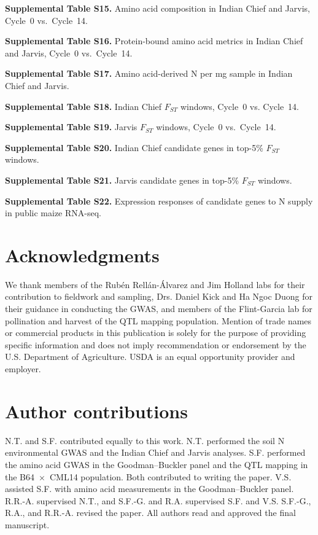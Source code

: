 \documentclass[namedate,unnumsec,webpdf,contemporary,large]{oup-authoring-template}
\begin{document}
\textbf{Supplemental Table S15.} Amino acid composition in Indian Chief and Jarvis, Cycle~0 vs.\ Cycle~14.

\textbf{Supplemental Table S16.} Protein-bound amino acid metrics in Indian Chief and Jarvis, Cycle~0 vs.\ Cycle~14.

\textbf{Supplemental Table S17.} Amino acid-derived N per mg sample in Indian Chief and Jarvis.

\textbf{Supplemental Table S18.} Indian Chief $F_{ST}$ windows, Cycle~0 vs. Cycle~14.

\textbf{Supplemental Table S19.} Jarvis $F_{ST}$ windows, Cycle~0 vs.\ Cycle~14.

\textbf{Supplemental Table S20.} Indian Chief candidate genes in top-5\% $F_{ST}$ windows.

\textbf{Supplemental Table S21.} Jarvis candidate genes in top-5\% $F_{ST}$ windows.

\textbf{Supplemental Table S22.} Expression responses of candidate genes to N supply in public maize RNA-seq.

\section{Acknowledgments}
We thank members of the Rub\'en Rell\'an-\'Alvarez and Jim Holland labs for their contribution to fieldwork and sampling, Drs. Daniel Kick and Ha Ngoc Duong for their guidance in conducting the GWAS, and members of the Flint-Garcia lab for pollination and harvest of the QTL mapping population. Mention of trade names or commercial products in this publication is solely for the purpose of providing specific information and does not imply recommendation or endorsement by the U.S. Department of Agriculture. USDA is an equal opportunity provider and employer.

\section{Author contributions}
N.T. and S.F. contributed equally to this work. N.T. performed the soil N environmental GWAS and the Indian Chief and Jarvis analyses. S.F. performed the amino acid GWAS in the Goodman--Buckler panel and the QTL mapping in the B64~$\times$~CML14 population. Both contributed to writing the paper. V.S. assisted S.F. with amino acid measurements in the Goodman--Buckler panel. R.R.-A. supervised N.T., and S.F.-G. and R.A. supervised S.F. and V.S. S.F.-G., R.A., and R.R.-A. revised the paper. All authors read and approved the final manuscript.
\end{document}
